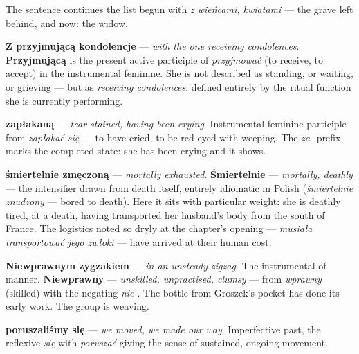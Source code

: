 
The sentence continues the list begun with \textit{z wieńcami,
kwiatami} --- the grave left behind, and now: the widow.

\textbf{Z przyjmującą kondolencje} --- \textit{with the one receiving
condolences}. \textbf{Przyjmującą} is the present active participle of
\textit{przyjmować} (to receive, to accept) in the instrumental
feminine. She is not described as standing, or waiting, or grieving
--- but as \textit{receiving condolences}: defined entirely by the
ritual function she is currently performing.

\textbf{zapłakaną} --- \textit{tear-stained, having been crying}.
Instrumental feminine participle from \textit{zapłakać się} --- to
have cried, to be red-eyed with weeping. The \textit{za-} prefix marks
the completed state: she has been crying and it shows.

\textbf{śmiertelnie zmęczoną} --- \textit{mortally exhausted}.
\textbf{Śmiertelnie} --- \textit{mortally, deathly} --- the intensifier
drawn from death itself, entirely idiomatic in Polish
(\textit{śmiertelnie znudzony} --- bored to death). Here it sits with
particular weight: she is deathly tired, at a death, having transported
her husband's body from the south of France. The logistics noted so
dryly at the chapter's opening --- \textit{musiała transportować jego
zwłoki} --- have arrived at their human cost.



\textbf{Niewprawnym zygzakiem} --- \textit{in an unsteady zigzag}.
The instrumental of manner. \textbf{Niewprawny} --- \textit{unskilled,
unpractised, clumsy} --- from \textit{wprawny} (skilled) with the
negating \textit{nie-}. The bottle from Groszek's pocket has done its
early work. The group is weaving.

\textbf{poruszaliśmy się} --- \textit{we moved, we made our way}.
Imperfective past, the reflexive \textit{się} with \textit{poruszać}
giving the sense of sustained, ongoing movement.

